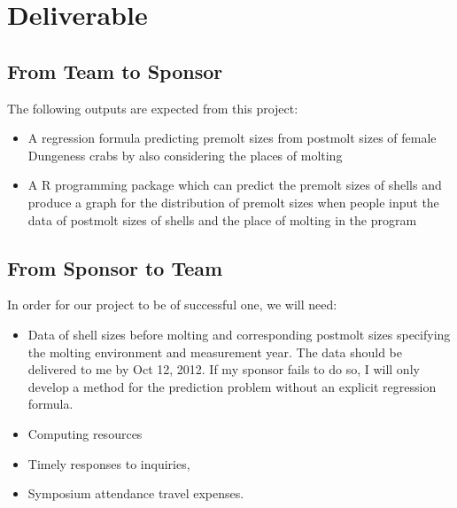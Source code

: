 \documentclass[12pt,letterpaper]{article}
\theoremstyle{definition}
\begin{document}
\section{Deliverable}
\subsection{From Team to Sponsor} %
The following outputs are expected from this project:
\begin{itemize}
    \item A regression formula predicting premolt sizes from postmolt sizes of female Dungeness crabs by also considering the places of molting
    \item A R programming package which can predict the premolt sizes of shells and produce a graph for the distribution of premolt sizes when people input the data of postmolt sizes of shells and the place of molting in the program
\end{itemize}

\subsection{From Sponsor to Team} %

In order for our project to be of successful one, we will need:
\begin{itemize}
    \item Data of shell sizes before molting and corresponding postmolt sizes specifying the molting environment and measurement year. The data should be delivered to me by Oct 12, 2012. If my sponsor fails to do so, I will only develop a method for the prediction problem without an explicit regression formula.
    \item Computing resources
    \item Timely responses to inquiries, 
    \item Symposium attendance travel expenses.
\end{itemize}



\end{document}
